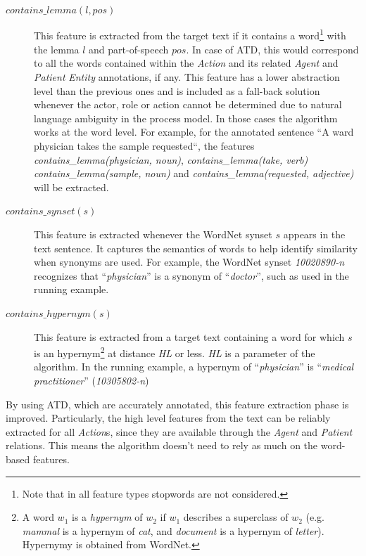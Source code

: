 \begin{description}
       \item[$contains\_lemma(l, pos)$]{This feature is extracted from the
           target text if it contains a word\footnote{Note that in all feature
             types stopwords are not considered.} with the lemma $l$ and
           part-of-speech $pos$. In case of ATD, this would correspond to all
           the words contained within the \emph{Action} and its related
           \emph{Agent} and \emph{Patient} \emph{Entity} annotations, if any.
           This feature has a lower abstraction level than
           the previous ones and is included as a fall-back solution
           whenever the actor, role or action cannot be determined due to
           natural language ambiguity in the process model. In those cases the
           algorithm works at the word level. For example, for the annotated
           sentence ``A ward physician takes the sample requested``, the
           features \textit{contains\_lemma(physician, noun)},
           \textit{contains\_lemma(take, verb)} \textit{contains\_lemma(sample,
             noun)} and \textit{contains\_lemma(requested, adjective)} will be
           extracted.}
         
       \item[$contains\_synset(s)$]{This feature is extracted whenever the
           WordNet synset $s$ appears in the text sentence. It captures the
           semantics of words to help identify similarity when synonyms are
           used. For example, the WordNet synset \textit{10020890-n} recognizes
           that ``\textit{physician}'' is a synonym of ``\textit{doctor}'',
           such as used in the running example.}

       \item[$contains\_hypernym(s)$]{This feature is extracted from a target
           text containing a word for which $s$ is an hypernym\footnote{A word
             $w_1$ is a \textit{hypernym} of $w_2$ if $w_1$ describes a
             superclass of $w_2$ (e.g. \textit{mammal} is a hypernym of
             \textit{cat}, and \textit{document} is a hypernym of
             \textit{letter}). Hypernymy is obtained from WordNet.} at distance
           \emph{HL} or less. \emph{HL} is a parameter of the algorithm. In the
           running example, a hypernym of ``\textit{physician}'' is
           ``\textit{medical practitioner}'' (\textit{10305802-n})}
\end{description}

By using ATD, which are accurately annotated, this feature extraction phase is
improved. Particularly, the high level features from the text can be reliably
extracted for all \emph{Action}s, since they are available through the
\emph{Agent} and \emph{Patient} relations. This means the algorithm doesn't need
to rely as much on the word-based features.

